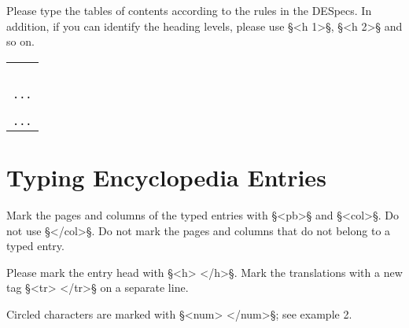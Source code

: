 \documentclass[fontsize=11pt, paper=a4, 
DIV15,
headings=normal,
parskip=half-, 
numbers=noenddot]{scrartcl}
\makeatletter
\newenvironment{typeChinese}{\begin{alltt}\large\begin{tabular}{@{}l}}{\end{tabular}\end{alltt}} %
\newcommand{\chin}[1]{{\fontspec{Sun-ExtA}{#1}}}
\newcommand{\f}[1]{\bold{#1}} %
\newcommand{\z}[1]{\chin{#1}} %
\makeatother
\begin{document}
Please type the tables of contents according to the rules in the DESpecs. In addition, if you can identify the heading levels, please use §<h 1>§, §<h 2>§ and so on. 

\vspace{2mm}
\begin{example}

\vspace{-5mm}
\begin{typeChinese}
\f{<ti>}\z{天工開物卷目錄}\f{</ti>} \\
\f{<h 1>}\z{上卷}\f{</h>} \\
\f{<h 2>}\z{乃粒第一卷}\f{</h>} \\
\f{<h 2>}\z{乃服第二卷}\f{</h>} \\
\f{<h 2>}\z{彰施第三卷}\f{</h>} \\
... \\
\f{<h 1>}\z{中卷}\f{</h>} \\
\f{<h 2>}\z{陶埏第七卷}\f{</h>} \\
... \\
\end{typeChinese}

\end{example}

\section{Typing Encyclopedia Entries}


%
%


Mark the pages and columns of the typed entries with §<pb>§ and §<col>§. Do not use §</col>§. Do not mark the pages and columns that do not belong to a typed entry.

Please mark the entry head with §<h> </h>§. Mark the translations with a new tag §<tr> </tr>§ on a separate line. 

Circled characters are marked with §<num> </num>§; see example 2.
\end{document}
